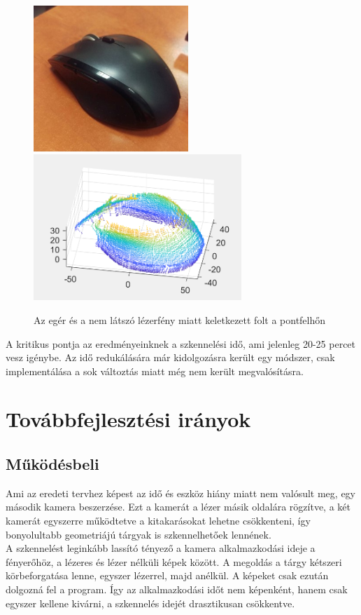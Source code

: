\documentclass[12pt,a4paper]{article}
\begin{document}
\begin{figure}[h!]
	\begin{center}
		\includegraphics[height=5.5cm]{images/mouse2}
		\includegraphics[height=5.5cm]{images/mouse1}
	\end{center}
	\caption{Az egér és a nem látszó lézerfény miatt keletkezett folt a pontfelhőn}
\end{figure}
A kritikus pontja az eredményeinknek a szkennelési idő, ami jelenleg 20-25 percet vesz igénybe. Az idő redukálására már kidolgozásra került egy módszer, csak implementálása a sok változtás miatt még nem került megvalósításra.\\[10pt]

\section{Továbbfejlesztési irányok} %
\subsection{Működésbeli}
Ami az eredeti tervhez képest az idő és eszköz hiány miatt nem valósult meg, egy második kamera beszerzése. Ezt a kamerát a lézer másik oldalára rögzítve, a két kamerát egyszerre működtetve a kitakarásokat lehetne csökkenteni, így bonyolultabb geometriájú tárgyak is szkennelhetőek lennének.
\\[10pt]
A szkennelést leginkább lassító tényező a kamera alkalmazkodási ideje a fényerőhöz, a lézeres és lézer nélküli képek között. A megoldás a tárgy kétszeri körbeforgatása lenne, egyszer lézerrel, majd anélkül. A képeket csak ezután dolgozná fel a program. Így az alkalmazkodási időt nem képenként, hanem csak egyszer kellene kivárni, a szkennelés idejét drasztikusan csökkentve.
\end{document}
